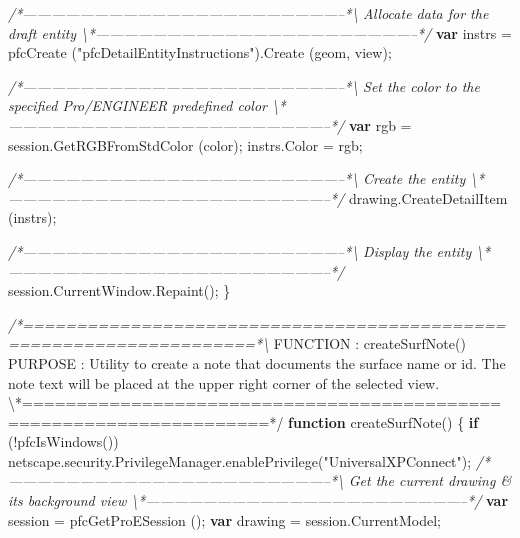 \documentclass[]{article}
\newenvironment{Shaded}{}{}
\newcommand{\KeywordTok}[1]{\textcolor[rgb]{0.00,0.44,0.13}{\textbf{{#1}}}}
\newcommand{\StringTok}[1]{\textcolor[rgb]{0.25,0.44,0.63}{{#1}}}
\newcommand{\CommentTok}[1]{\textcolor[rgb]{0.38,0.63,0.69}{\textit{{#1}}}}
\newcommand{\OtherTok}[1]{\textcolor[rgb]{0.00,0.44,0.13}{{#1}}}
\newcommand{\FunctionTok}[1]{\textcolor[rgb]{0.02,0.16,0.49}{{#1}}}
\newcommand{\NormalTok}[1]{{#1}}
\begin{document}
\begin{Shaded}
\begin{Highlighting}[]
\CommentTok{/*--------------------------------------------------------------------*\textbackslash{} }
\CommentTok{  Allocate data for the draft entity }
\CommentTok{\textbackslash{}*--------------------------------------------------------------------*/}     
  \KeywordTok{var} \NormalTok{instrs = }\FunctionTok{pfcCreate} \NormalTok{(}\StringTok{"pfcDetailEntityInstructions"}\NormalTok{).}\FunctionTok{Create} \NormalTok{(geom, }
                                 \NormalTok{view);}

\CommentTok{/*--------------------------------------------------------------------*\textbackslash{} }
\CommentTok{  Set the color to the specified Pro/ENGINEER predefined color }
\CommentTok{\textbackslash{}*--------------------------------------------------------------------*/}
  \KeywordTok{var} \NormalTok{rgb = }\OtherTok{session}\NormalTok{.}\FunctionTok{GetRGBFromStdColor} \NormalTok{(color);}
  \OtherTok{instrs}\NormalTok{.}\FunctionTok{Color} \NormalTok{= rgb;     }
  
\CommentTok{/*--------------------------------------------------------------------*\textbackslash{} }
\CommentTok{  Create the entity }
\CommentTok{\textbackslash{}*--------------------------------------------------------------------*/}     
  \OtherTok{drawing}\NormalTok{.}\FunctionTok{CreateDetailItem} \NormalTok{(instrs);}

\CommentTok{/*--------------------------------------------------------------------*\textbackslash{} }
\CommentTok{  Display the entity }
\CommentTok{\textbackslash{}*--------------------------------------------------------------------*/}     
  \OtherTok{session}\NormalTok{.}\OtherTok{CurrentWindow}\NormalTok{.}\FunctionTok{Repaint}\NormalTok{(); }
\NormalTok{\}}
 
 
\CommentTok{/*====================================================================*\textbackslash{}}
\NormalTok{FUNCTION : }\FunctionTok{createSurfNote}\NormalTok{() }
\NormalTok{PURPOSE  : Utility to create a note that documents the surface name or }\OtherTok{id}\NormalTok{.}
\NormalTok{The note text will be placed at the upper right corner of the selected }\OtherTok{view}\NormalTok{.}
\NormalTok{\textbackslash{}*====================================================================*}\OtherTok{/}
\KeywordTok{function} \FunctionTok{createSurfNote}\NormalTok{()}
\NormalTok{\{}
  \KeywordTok{if} \NormalTok{(!}\FunctionTok{pfcIsWindows}\NormalTok{())}
    \OtherTok{netscape}\NormalTok{.}\OtherTok{security}\NormalTok{.}\OtherTok{PrivilegeManager}\NormalTok{.}\FunctionTok{enablePrivilege}\NormalTok{(}\StringTok{"UniversalXPConnect"}\NormalTok{); }
\CommentTok{/*--------------------------------------------------------------------*\textbackslash{} }
\CommentTok{  Get the current drawing & its background view}
\CommentTok{\textbackslash{}*--------------------------------------------------------------------*/}  
  \KeywordTok{var} \NormalTok{session = }\FunctionTok{pfcGetProESession} \NormalTok{();}
  \KeywordTok{var} \NormalTok{drawing = }\OtherTok{session}\NormalTok{.}\FunctionTok{CurrentModel}\NormalTok{;}
  

\end{Highlighting}
\end{Shaded}
\end{document}
